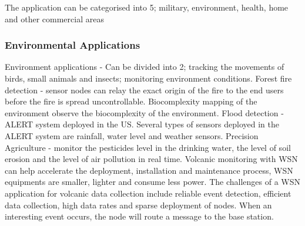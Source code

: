 The application can be categorised into 5; military, environment, health, home and other commercial areas \cite{wsnSurvey2}

\subsubsection{Environmental Applications}
Environment applications - Can be divided into 2; tracking the movements of birds, small animals and insects; monitoring environment conditions. Forest fire detection - sensor nodes can relay the exact origin of the fire to the end users before the fire is spread uncontrollable. Biocomplexity mapping of the environment \cite{Cerpahabitatmonitoring} observe the biocomplexity of the environment. Flood detection - ALERT system deployed in the US. Several types of sensors deployed in the ALERT system are rainfall, water level and weather sensors. Precision Agriculture - monitor the pesticides level in the drinking water, the level of soil erosion and the level of air pollution in real time. 
Volcanic monitoring \cite{volcano} with WSN can help accelerate the deployment, installation and maintenance process, WSN equipments are smaller, lighter and consume less power. The challenges of a WSN application for volcanic data collection include reliable event detection, efficient data collection, high data rates and sparse deployment of nodes. When an interesting event occurs, the node will route a message to the base station.


